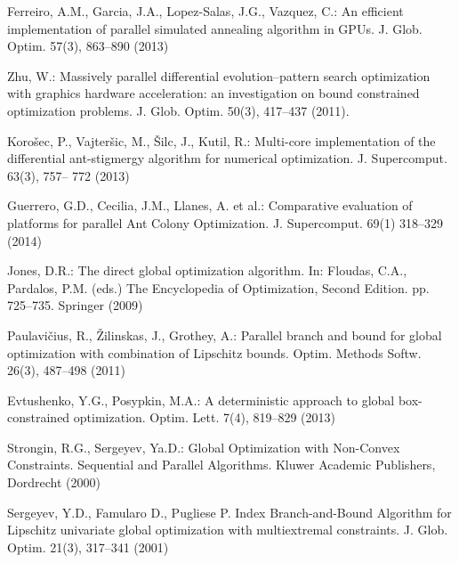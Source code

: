 \documentclass[smallextended]{svjour3}       %
\begin{document}
\begin{thebibliography}{}

Ferreiro, A.M., Garcia, J.A., Lopez-Salas, J.G., Vazquez, C.: An efficient implementation of 
parallel simulated annealing algorithm in GPUs. J. Glob. Optim. 57(3), 863--890 (2013)

Zhu, W.: Massively parallel differential evolution--pattern search optimization with graphics 
hardware acceleration: an investigation on bound constrained optimization problems. J. Glob. 
Optim. 50(3), 417--437 (2011).

Koro\v sec, P., Vajter\v sic, M.,  \v Silc, J., Kutil, R.: Multi-core implementation of the 
differential ant-stigmergy algorithm for numerical optimization. J. Supercomput. 63(3), 757--
772 (2013)

Guerrero, G.D., Cecilia, J.M., Llanes, A. et al.: Comparative evaluation of platforms for parallel 
Ant Colony Optimization. J. Supercomput. 69(1) 318--329 (2014)

Jones, D.R.: The direct global optimization algorithm. In: Floudas, C.A., Pardalos, P.M. (eds.) 
The Encyclopedia of Optimization, Second Edition. pp. 725--735. Springer (2009)

Paulavi\v cius, R., \v Zilinskas, J., Grothey, A.: Parallel branch and bound for global 
optimization with combination of Lipschitz bounds. Optim. Methods Softw. 26(3), 487--498 
(2011)

Evtushenko, Y.G., Posypkin, M.A.: A deterministic approach to global box-constrained 
optimization. Optim. Lett. 7(4), 819--829 (2013)

Strongin, R.G., Sergeyev, Ya.D.: Global Optimization with Non-Convex Constraints. 
Sequential and Parallel Algorithms. Kluwer Academic Publishers, Dordrecht (2000)



Sergeyev, Y.D., Famularo D., Pugliese P. Index Branch-and-Bound Algorithm for Lipschitz 
univariate global optimization with multiextremal constraints. J. Glob. Optim. 21(3), 317--341 
(2001) 


\end{thebibliography}
\end{document}
